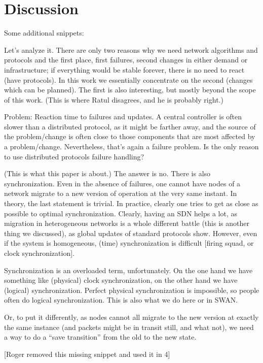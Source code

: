 \section{Discussion}
\label{sec:discussion}

Some additional snippets:

Let’s analyze it. There are only two reasons why we need network algorithms and protocols and the first place, first failures, second changes in either demand or infrastructure; if everything would be stable forever, there is no need to react (have protocols). In this work we essentially concentrate on the second (changes which can be planned). The first is also interesting, but mostly beyond the scope of this work. (This is where Ratul disagrees, and he is probably right.)

Problem: Reaction time to failures and updates. A central controller is often slower than a distributed protocol, as it might be farther away, and the source of the problem/change is often close to those components that are most affected by a problem/change. Nevertheless, that’s again a failure problem. Is the only reason to use distributed protocols failure handling?

(This is what this paper is about.) The answer is no. There is also synchronization. Even in the absence of failures, one cannot have nodes of a network migrate to a new version of operation at the very same instant. In theory, the last statement is trivial. In practice, clearly one tries to get as close as possible to optimal synchronization. Clearly, having an SDN helps a lot, as migration in heterogeneous networks is a whole different battle (this is another thing we discussed), as global updates of standard protocols show. However, even if the system is homogeneous, (time) synchronization is difficult [firing squad, or clock synchronization].

Synchronization is an overloaded term, unfortunately. On the one hand we have something like (physical) clock synchronization, on the other hand we have (logical) synchronization. Perfect physical synchronization is impossible, so people often do logical synchronization. This is also what we do here or in SWAN.

Or, to put it differently, as nodes cannot all migrate to the new version at exactly the same instance (and packets might be in transit still, and what not), we need a way to do a ``save transition'' from the old to the new state.

[Roger removed this missing snippet and used it in 4]

